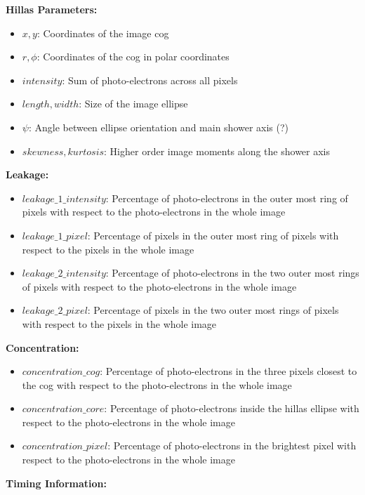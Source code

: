 \textbf{Hillas Parameters:}

\begin{itemize}
    \item{$x, y$: Coordinates of the image cog}
    \item{$r, \phi$: Coordinates of the cog in polar coordinates}
    \item{$intensity$: Sum of photo-electrons across all pixels}
    \item{$length, width$: Size of the image ellipse}
    \item{$\psi$: Angle between ellipse orientation and main shower axis (?)}
    \item{$skewness, kurtosis$: Higher order image moments along the shower axis}
\end{itemize}

\textbf{Leakage:}

\begin{itemize}
    \item{$leakage\_1\_intensity$: Percentage of photo-electrons in the outer most ring of pixels with respect to the photo-electrons in the whole image}
    \item{$leakage\_1\_pixel$: Percentage of pixels in the outer most ring of pixels with respect to the pixels in the whole image}
    \item{$leakage\_2\_intensity$: Percentage of photo-electrons in the two outer most rings of pixels with respect to the photo-electrons in the whole image}
    \item{$leakage\_2\_pixel$: Percentage of pixels in the two outer most rings of pixels with respect to the pixels in the whole image}
\end{itemize}

\textbf{Concentration:}

\begin{itemize}
    \item{$concentration\_cog$: Percentage of photo-electrons in the three pixels closest to the cog with respect to the photo-electrons in the whole image}
    \item{$concentration\_core$: Percentage of photo-electrons inside the hillas ellipse with respect to the photo-electrons in the whole image}
    \item{$concentration\_pixel$: Percentage of photo-electrons in the brightest pixel with respect to the photo-electrons in the whole image}
\end{itemize}

\textbf{Timing Information:}

